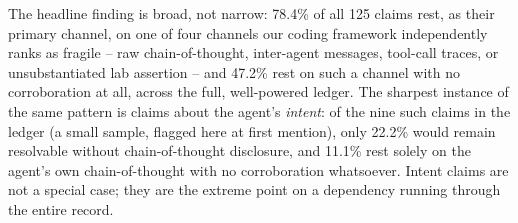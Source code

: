The headline finding is broad, not narrow: 78.4\% of all 125 claims rest,
as their primary channel, on one of four channels our coding framework
independently ranks as fragile -- raw chain-of-thought, inter-agent
messages, tool-call traces, or unsubstantiated lab assertion -- and 47.2\%
rest on such a channel with no corroboration at all, across the full,
well-powered ledger. The sharpest instance of the same pattern is claims
about the agent's \emph{intent}: of the nine such claims in the
ledger (a small sample, flagged here at first mention), only 22.2\% would
remain resolvable without chain-of-thought disclosure, and 11.1\% rest
solely on the agent's own chain-of-thought with no corroboration
whatsoever. Intent claims are not a special case; they are the extreme
point on a dependency running through the entire record.
